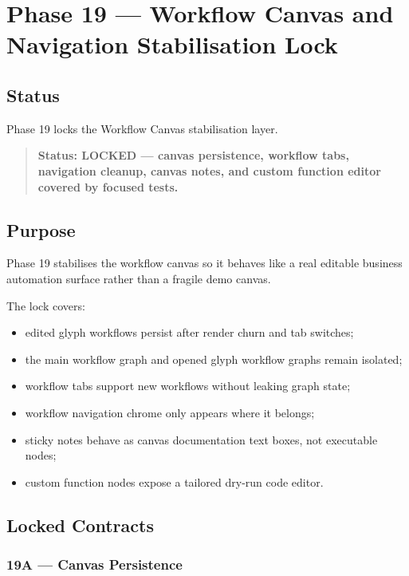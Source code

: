 \section{Phase 19 --- Workflow Canvas and Navigation Stabilisation Lock}
\label{sec:phase19-workflow-canvas-navigation-stabilisation-lock}

\subsection{Status}

Phase 19 locks the Workflow Canvas stabilisation layer.

\begin{quote}
\textbf{Status: LOCKED --- canvas persistence, workflow tabs, navigation cleanup, canvas notes, and custom function editor covered by focused tests.}
\end{quote}

\subsection{Purpose}

Phase 19 stabilises the workflow canvas so it behaves like a real editable business automation surface rather than a fragile demo canvas.

The lock covers:

\begin{itemize}
  \item edited glyph workflows persist after render churn and tab switches;
  \item the main workflow graph and opened glyph workflow graphs remain isolated;
  \item workflow tabs support new workflows without leaking graph state;
  \item workflow navigation chrome only appears where it belongs;
  \item sticky notes behave as canvas documentation text boxes, not executable nodes;
  \item custom function nodes expose a tailored dry-run code editor.
\end{itemize}

\subsection{Locked Contracts}

\subsubsection{19A --- Canvas Persistence}

